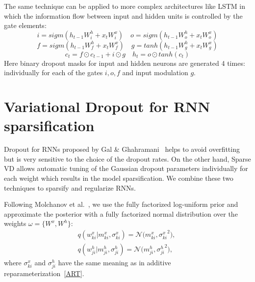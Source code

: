 \documentclass{article}
\begin{document}
The same technique can be applied to more complex architectures like LSTM in which the information flow between input and hidden units is controlled by the gate elements:
\begin{equation*}
\label{LSTM1}
i = sigm(h_{t-1}W^h_i + x_t W^x_i) \quad
o = sigm(h_{t-1}W^h_o + x_t W^x_o) 
\end{equation*}
\begin{equation*}
f = sigm(h_{t-1}W^h_f + x_t W^x_f) \quad 
\label{LSTM2}
g = tanh(h_{t-1} W^h_g + x_t W^x_g) 
\end{equation*}
\begin{equation}
c_t = f \odot c_{t-1} +  i \odot  g \quad
h_t =  o \odot tanh(c_t)
\end{equation}%
Here binary dropout masks for input and hidden neurons are generated 4 times: individually for each of the gates $i,o,f$ and input modulation $g$. 

\section{Variational Dropout for RNN sparsification}
Dropout for RNNs proposed by Gal \& Ghahramani~ helps to avoid overfitting but is very sensitive to the choice of the dropout rates.
On the other hand, Sparse VD allows automatic tuning of the Gaussian dropout parameters individually for each weight which results in the model sparsification. We combine these two techniques to sparsify and regularize RNNs. 

Following Molchanov et al.~, we use the fully factorized log-uniform prior and approximate the posterior with a fully factorized normal distribution over the weights $\omega=\{W^x, W^h\}$:
\begin{equation}
\begin{gathered}
q(w^x_{ki}|m^x_{ki}, \sigma^x_{ki}) = \mathcal{N}\bigl(m^x_{ki}, {\sigma^x_{ki}}^2\bigr), \:\\
q(w^h_{ji}|m^h_{ji}, \sigma^h_{ji}) = \mathcal{N}\bigl(m^h_{ji}, {\sigma^h_{ji}}^2\bigr), %
\end{gathered}
\end{equation}
where $\sigma^x_{ki}$ and $\sigma^h_{ji}$ have the same meaning as in additive reparameterization~\eqref{ART}.
\end{document}
